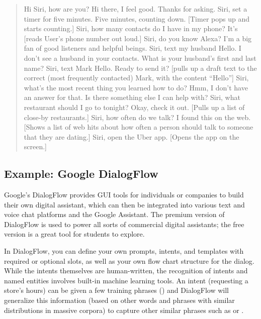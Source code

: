  \begin{quote}
 \begin{dialogue}
  Hi Siri, how are you?
  Hi there, I feel good. Thanks for asking.
  Siri, set a timer for five minutes.
  Five minutes, counting down. [Timer pops up and starts counting.]
  Siri, how many contacts do I have in my phone?
  It's [reads User's phone number out loud.]
  Siri, do you know Alexa?
   I'm a big fan of good listeners and helpful beings.
  Siri, text my husband Hello.
  I don't see a husband in your contacts. What is your husband's first and last name?
  Siri, text Mark Hello.
  Ready to send it? [pulls up a draft text to the correct (most frequently contacted) Mark, with the content ``Hello'']
  Siri, what's the most recent thing you learned how to do?
  Hmm, I don't have an answer for that. Is there something else I can help with?
  Siri, what restaurant should I go to tonight?
  Okay, check it out. [Pulls up a list of close-by restaurants.]
  Siri, how often do we talk?
  I found this on the web. [Shows a list of web hits about how often a person should talk to someone that they are dating.]
  Siri, open the Uber app.
  [Opens the app on the screen.]
 \end{dialogue}
 \end{quote}


\subsection{Example: Google DialogFlow}

Google's DialogFlow provides GUI tools for individuals or companies to build their own digital assistant, which can then be integrated into various text and voice chat platforms and the Google Assistant.  The premium version of DialogFlow is used to power all sorts of commercial digital assistants; the free version is a great tool for students to explore.

In DialogFlow, you can define your own prompts, intents, and templates with required or optional slots, as well as your own flow chart structure for the dialog.    While the intents themselves are human-written, the  recognition of intents and named entities involves built-in machine learning tools.  An intent (requesting a store's hours) can be given a few training phrases () and DialogFlow will generalize this information  (based on other words and phrases with similar distributions in massive corpora) to capture other similar phrases such as  or . 


